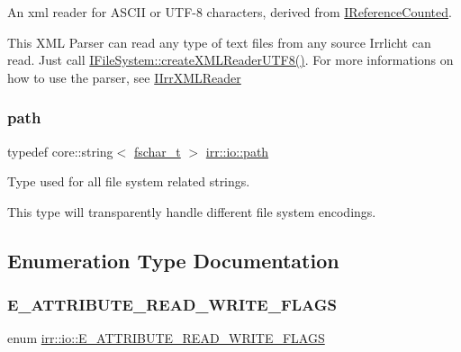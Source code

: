 An xml reader for A\+S\+C\+II or U\+T\+F-\/8 characters, derived from \hyperlink{classirr_1_1IReferenceCounted}{I\+Reference\+Counted}. 

This X\+ML Parser can read any type of text files from any source Irrlicht can read. Just call \hyperlink{classirr_1_1io_1_1IFileSystem_affd8f622ac7c3dcd507f20f9cd23b21f}{I\+File\+System\+::create\+X\+M\+L\+Reader\+U\+T\+F8()}. For more informations on how to use the parser, see \hyperlink{classirr_1_1io_1_1IIrrXMLReader}{I\+Irr\+X\+M\+L\+Reader} \mbox{\label{namespaceirr_1_1io_a6468281622ce3a1c46b72e19f32dded5}} 
\subsubsection{\texorpdfstring{path}{path}}
{\footnotesize\ttfamily typedef core\+::string$<$ \hyperlink{namespaceirr_a813cca9bac9fa0c1427d89720a451460}{fschar\+\_\+t} $>$ \hyperlink{namespaceirr_1_1io_a6468281622ce3a1c46b72e19f32dded5}{irr\+::io\+::path}}



Type used for all file system related strings. 

This type will transparently handle different file system encodings. 

\subsection{Enumeration Type Documentation}
\mbox{\label{namespaceirr_1_1io_a84923cf86af38e49c6ec5ee36903d782}} 
\subsubsection{\texorpdfstring{E\+\_\+\+A\+T\+T\+R\+I\+B\+U\+T\+E\+\_\+\+R\+E\+A\+D\+\_\+\+W\+R\+I\+T\+E\+\_\+\+F\+L\+A\+GS}{E\_ATTRIBUTE\_READ\_WRITE\_FLAGS}\hspace{0.1cm}{\footnotesize\ttfamily [1/2]}}
{\footnotesize\ttfamily enum \hyperlink{namespaceirr_1_1io_a84923cf86af38e49c6ec5ee36903d782}{irr\+::io\+::\+E\+\_\+\+A\+T\+T\+R\+I\+B\+U\+T\+E\+\_\+\+R\+E\+A\+D\+\_\+\+W\+R\+I\+T\+E\+\_\+\+F\+L\+A\+GS}}



